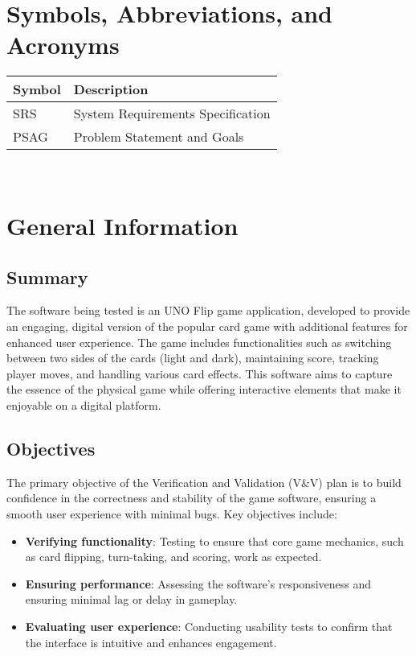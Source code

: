 \documentclass[12pt, titlepage]{article}
\begin{document}
\section{Symbols, Abbreviations, and Acronyms}

\renewcommand{\arraystretch}{1.2}
\begin{tabular}{l l} 
  \toprule		
  \textbf{Symbol} & \textbf{Description}\\
  \midrule 
  SRS & System Requirements Specification\\
  PSAG & Problem Statement and Goals\\
  \bottomrule
\end{tabular}\\

\newpage


\section{General Information}

\subsection{Summary}
The software being tested is an UNO Flip game application, developed to provide an engaging, digital version of the popular card game with additional features for enhanced user experience. The game includes functionalities such as switching between two sides of the cards (light and dark), maintaining score, tracking player moves, and handling various card effects. This software aims to capture the essence of the physical game while offering interactive elements that make it enjoyable on a digital platform.

\subsection{Objectives}
The primary objective of the Verification and Validation (V\&V) plan is to build confidence in the correctness and stability of the game software, ensuring a smooth user experience with minimal bugs. Key objectives include:

\begin{itemize}
    \item \textbf{Verifying functionality}: Testing to ensure that core game mechanics, such as card flipping, turn-taking, and scoring, work as expected.
    \item \textbf{Ensuring performance}: Assessing the software’s responsiveness and ensuring minimal lag or delay in gameplay.
    \item \textbf{Evaluating user experience}: Conducting usability tests to confirm that the interface is intuitive and enhances engagement.
\end{itemize}
\end{document}
